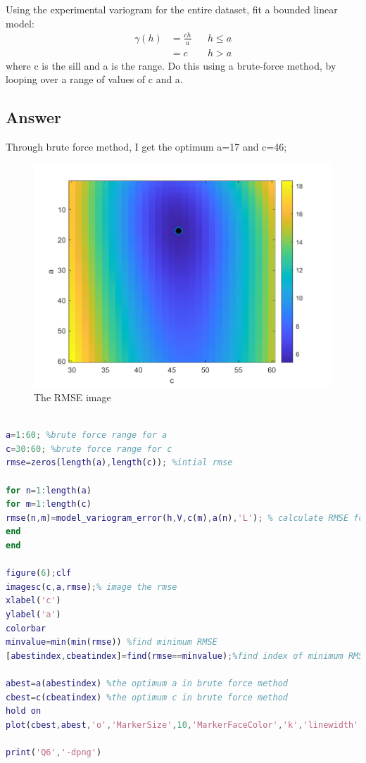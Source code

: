 \documentclass[
	12pt, %
]{fphw}
\begin{document}
\begin{problem}
Using the experimental variogram for the entire dataset, fit a bounded linear model:
\begin{equation}
	\begin{aligned}
	\gamma(h) &=\frac{c h}{a} & & h \leq a \\
	&=c & & h>a
	\end{aligned}
\end{equation}
where c is the sill and a is the range. Do this using a brute-force method, by looping over a
range of values of c and a.

\end{problem}

\subsection*{Answer}

Through brute force method, I get the optimum a=17 and c=46;

\begin{figure}[htbp]
	\centering
	\includegraphics[width=0.8\columnwidth]{Q6.png} 
	\caption{The RMSE image}
\end{figure}

\begin{lstlisting}[language=Matlab,escapeinside=``]
% brute force approach

a=1:60; %brute force range for a
c=30:60; %brute force range for c
rmse=zeros(length(a),length(c)); %intial rmse

for n=1:length(a)
for m=1:length(c)
rmse(n,m)=model_variogram_error(h,V,c(m),a(n),'L'); % calculate RMSE for the all a and c
end
end

figure(6);clf
imagesc(c,a,rmse);% image the rmse
xlabel('c')
ylabel('a')
colorbar
minvalue=min(min(rmse)) %find minimum RMSE
[abestindex,cbeatindex]=find(rmse==minvalue);%find index of minimum RMSE

abest=a(abestindex) %the optimum a in brute force method
cbest=c(cbeatindex) %the optimum c in brute force method
hold on
plot(cbest,abest,'o','MarkerSize',10,'MarkerFaceColor','k','linewidth',2); % plot the best point in image

print('Q6','-dpng')


\end{lstlisting} 
\end{document}
